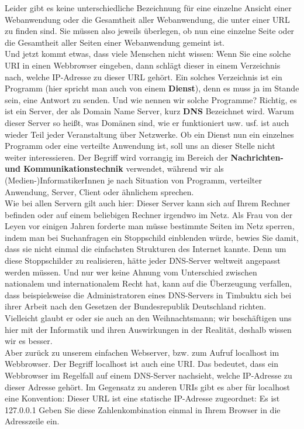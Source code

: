 Leider gibt es keine unterschiedliche Bezeichnung für eine einzelne Ansicht einer Webanwendung oder die Gesamtheit aller Webanwendung, die unter einer URL zu finden sind. Sie müssen also jeweils überlegen, ob nun eine einzelne Seite oder die Gesamtheit aller Seiten einer Webanwendung gemeint ist.\\

Und jetzt kommt etwas, dass viele Menschen nicht wissen: Wenn Sie eine solche URI in einen Webbrowser eingeben, dann schlägt dieser in einem Verzeichnis nach, welche IP-Adresse zu dieser URL gehört. Ein solches Verzeichnis ist ein Programm (hier spricht man auch von einem \textbf{Dienst}), denn es muss ja im Stande sein, eine Antwort zu senden. Und wie nennen wir solche Programme? Richtig, es ist ein Server, der als Domain Name Server, kurz \textbf{DNS} Bezeichnet wird. Warum dieser Server so heißt, was Domänen sind, wie er funktioniert usw. usf. ist auch wieder Teil jeder Veranstaltung über Netzwerke. Ob ein Dienst nun ein einzelnes Programm oder eine verteilte Anwendung ist, soll uns an dieser Stelle nicht weiter interessieren. Der Begriff wird vorrangig im Bereich der \textbf{Nachrichten- und Kommunikationstechnik} verwendet, während wir als (Medien-)InformatikerInnen je nach Situation von Programm, verteilter Anwendung, Server, Client oder ähnlichem sprechen.\\

Wie bei allen Servern gilt auch hier: Dieser Server kann sich auf Ihrem Rechner befinden oder auf einem beliebigen Rechner irgendwo im Netz. Als Frau von der Leyen vor einigen Jahren forderte man müsse bestimmte Seiten im Netz sperren, indem man bei Suchanfragen ein Stoppschild einblenden würde, bewies Sie damit, dass sie nicht einmal die einfachsten Strukturen des Internet kannte. Denn um diese Stoppschilder zu realisieren, hätte jeder DNS-Server weltweit angepasst werden müssen. Und nur wer keine Ahnung vom Unterschied zwischen nationalem und internationalem Recht hat, kann auf die Überzeugung verfallen, dass beispielsweise die Administratoren eines DNS-Servers in Timbuktu sich bei ihrer Arbeit nach den Gesetzen der Bundesrepublik Deutschland richten. Vielleicht glaubt er oder sie auch an den Weihnachtsmann; wir beschäftigen uns hier mit der Informatik und ihren Auswirkungen in der Realität, deshalb wissen wir es besser.\\

Aber zurück zu unserem einfachen Webserver, bzw. zum Aufruf localhost im Webbrowser. Der Begriff localhost ist auch eine URI. Das bedeutet, dass ein Webbrowser im Regelfall auf einem DNS-Server nachsieht, welche IP-Adresse zu dieser Adresse gehört. Im Gegensatz zu anderen URIs gibt es aber für localhost eine Konvention: Dieser URL ist eine statische IP-Adresse zugeordnet: Es ist 127.0.0.1 Geben Sie diese Zahlenkombination einmal in Ihrem Browser in die Adresszeile ein.\\

